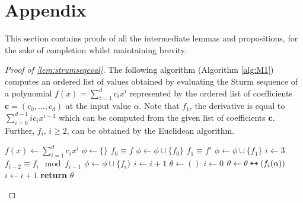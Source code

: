 \documentclass[a4paper,UKenglish,cleveref,autoref,thm-restate]{lipics-v2021}
\newcommand\catenate{\mathbin{\text{\ttfamily\upshape ++}}}
\begin{document}
\section{Appendix}
This section contains proofs of all the intermediate lemmas and propositions, for the sake of completion whilst maintaining brevity. 
\begin{proof}[Proof of \cref{lem:strumseqeval}]
	The following algorithm (Algorithm \ref{alg:M1}) computes an ordered
	list of values obtained by evaluating the Sturm sequence of a
	polynomial $f(x)=\sum_{i=1}^dc_ix^i$ represented by the ordered list
	of coefficients $\mathbf{c}=(c_0, \dots, c_d)$ at the input value
	$\alpha$. Note that $f_1$, the derivative is equal to
	$\sum_{i=0}^{d-1} i c_{i} x^{i-1}$ which can be computed from the
	given list of coefficients $\textbf{c}$. Further, $f_i$, $i \ge 2$,
	can be obtained by the Euclidean algorithm.
	\begin{algorithm}[!h]
		\begin{algorithmic}[1]
			\caption{Algorithm to compute the Sturm Sequence}\label{alg:M1}
			\State $f(x)\gets\sum_{i=1}^dc_ix^i$  
			\State $\phi\gets\{\}$  
			\State $f_0\equiv f$ 
			\State $\phi\gets\phi\cup \{f_0\}$ 
			\State $f_1\equiv f'$  
			\State $\phi\gets\phi\cup \{f_1\}$ 
			\State $i\gets3$ 
			\State $f_{i-2}\equiv f_i\mod f_{i-1}$   
			\State $\phi\gets\phi\cup \{f_i\}$ 
			\State $i\gets i+1$ 
			\EndWhile 
			\Statex
			\State $\theta\gets()$  
			\State $i\gets0$
			\State $\theta\gets\theta \catenate (f_i(\alpha))$
			\State $i\gets i+1$
			\EndWhile 
			\State \textbf{return} $\theta$ 
			\EndProcedure
		\end{algorithmic}
	\end{algorithm}
\end{proof}
\end{document}

